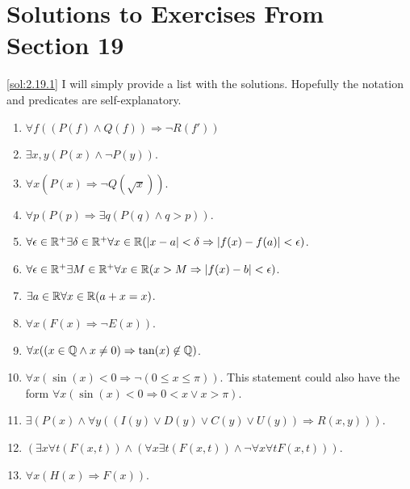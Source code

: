 \section*{Solutions to Exercises From Section 19}
\begin{solution}\label{sol:2.19.1}\ref{sol:2.19.1}
    I will simply provide a list with the solutions. Hopefully the notation and predicates are self-explanatory.
    \begin{enumerate}
        \item $\forall f((P(f)\land Q(f))\Rightarrow \neg R(f'))$
        \item $\exists x,y(P(x)\land \neg P(y))$.
        \item $\forall x(P(x)\Rightarrow\neg Q(\sqrt{x}))$.
        \item $\forall p(P(p)\Rightarrow \exists q(P(q)\land q > p))$.
        \item $\forall \epsilon \in \mathbb{R}^{+}\exists\delta\in\mathbb{R}^{+}\forall x\in\mathbb{R}(\lvert x-a \rvert<\delta \Rightarrow \lvert f(x)-f(a) \rvert<\epsilon)$.
        \item $\forall \epsilon \in \mathbb{R}^{+}\exists M\in\mathbb{R}^{+}\forall x\in\mathbb{R}(x>M\Rightarrow\lvert f(x)-b \rvert<\epsilon)$. 
        \item $\exists a \in \mathbb{R}\forall x\in\mathbb{R}(a+x=x)$. 
        \item $\forall x(F(x)\Rightarrow \neg E(x))$.
        \item $\forall x((x\in \mathbb{Q}\land x\ne 0)\Rightarrow \tan(x)\not\in\mathbb{Q})$. 
        \item $\forall x(\sin(x)<0\Rightarrow \neg(0\le x\le \pi))$. This statement could also have the form $\forall x(\sin(x)<0\Rightarrow 0<x \lor x>\pi)$.
        \item $\exists (P(x)\land \forall y((I(y)\lor D(y)\lor C(y)\lor U(y))\Rightarrow R(x,y)))$.
        \item $(\exists x\forall t(F(x,t)) \land (\forall x\exists t (F(x,t))\land \neg \forall x\forall t F(x,t)))$.
        \item $\forall x(H(x)\Rightarrow F(x))$. 
    \end{enumerate}
    
    
    
    
\end{solution}